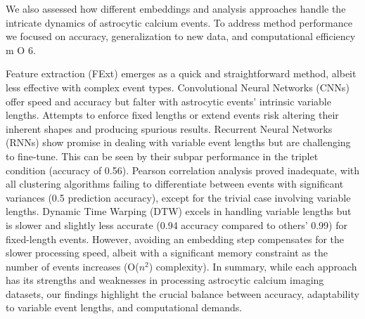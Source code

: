 \documentclass[utf8]{FrontiersinHarvard}
\newcommand{\fref}{ m O{} }{ (Figure~\ref{fig:#1}\IfValueT{#2}{\,#2})}
\begin{document}
    We also assessed how different embeddings and analysis approaches handle the intricate dynamics of astrocytic calcium events. To address method performance we focused on accuracy, generalization to new data, and computational efficiency\fref{6}. 

    Feature extraction (FExt) emerges as a quick and straightforward method, albeit less effective with complex event types. Convolutional Neural Networks (CNNs) offer speed and accuracy but falter with astrocytic events' intrinsic variable lengths. Attempts to enforce fixed lengths or extend events risk altering their inherent shapes and producing spurious results. Recurrent Neural Networks (RNNs) show promise in dealing with variable event lengths but are challenging to fine-tune. This can be seen by their subpar performance in the triplet condition (accuracy of 0.56). Pearson correlation analysis proved inadequate, with all clustering algorithms failing to differentiate between events with significant variances (0.5 prediction accuracy), except for the trivial case involving variable lengths. Dynamic Time Warping (DTW) excels in handling variable lengths but is slower and slightly less accurate (0.94 accuracy compared to others' 0.99) for fixed-length events. However, avoiding an embedding step compensates for the slower processing speed, albeit with a significant memory constraint as the number of events increases (O($n^2$) complexity). In summary, while each approach has its strengths and weaknesses in processing astrocytic calcium imaging datasets, our findings highlight the crucial balance between accuracy, adaptability to variable event lengths, and computational demands.
\end{document}
